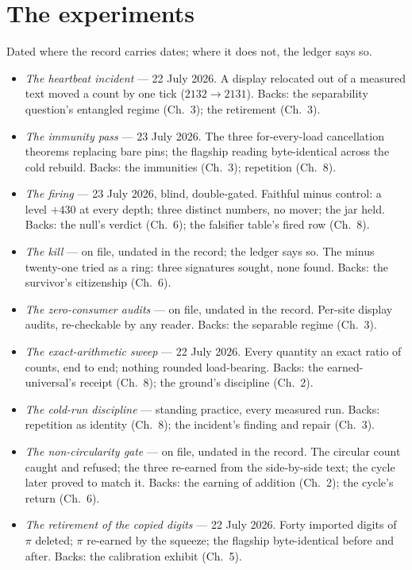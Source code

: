 \section*{The experiments}

Dated where the record carries dates; where it does not, the ledger says so.

\begin{itemize}
\item[E1.] \emph{The heartbeat incident} --- 22 July 2026. A display relocated out
of a measured text moved a count by one tick ($2132 \to 2131$). Backs: the
separability question's entangled regime (Ch.~3); the retirement (Ch.~3).
\item[E2.] \emph{The immunity pass} --- 23 July 2026. The three for-every-load
cancellation theorems replacing bare pins; the flagship reading byte-identical
across the cold rebuild. Backs: the immunities (Ch.~3); repetition (Ch.~8).
\item[E3.] \emph{The firing} --- 23 July 2026, blind, double-gated. Faithful minus
control: a level $+430$ at every depth; three distinct numbers, no mover; the jar
held. Backs: the null's verdict (Ch.~6); the falsifier table's fired row (Ch.~8).
\item[E4.] \emph{The kill} --- on file, undated in the record; the ledger says so.
The minus twenty-one tried as a ring: three signatures sought, none found. Backs:
the survivor's citizenship (Ch.~6).
\item[E5.] \emph{The zero-consumer audits} --- on file, undated in the record.
Per-site display audits, re-checkable by any reader. Backs: the separable regime
(Ch.~3).
\item[E6.] \emph{The exact-arithmetic sweep} --- 22 July 2026. Every quantity an
exact ratio of counts, end to end; nothing rounded load-bearing. Backs: the
earned-universal's receipt (Ch.~8); the ground's discipline (Ch.~2).
\item[E7.] \emph{The cold-run discipline} --- standing practice, every measured
run. Backs: repetition as identity (Ch.~8); the incident's finding and repair
(Ch.~3).
\item[E8.] \emph{The non-circularity gate} --- on file, undated in the record. The
circular count caught and refused; the three re-earned from the side-by-side
text; the cycle later proved to match it. Backs: the earning of addition (Ch.~2);
the cycle's return (Ch.~6).
\item[E9.] \emph{The retirement of the copied digits} --- 22 July 2026. Forty
imported digits of $\pi$ deleted; $\pi$ re-earned by the squeeze; the flagship
byte-identical before and after. Backs: the calibration exhibit (Ch.~5).
\end{itemize}

